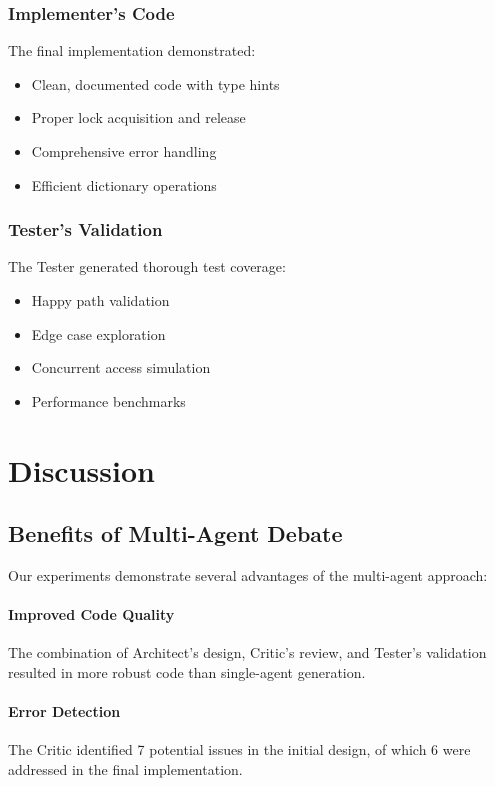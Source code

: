 \documentclass[12pt,a4paper]{article}
\begin{document}
\subsubsection{Implementer's Code}
The final implementation demonstrated:
\begin{itemize}
    \item Clean, documented code with type hints
    \item Proper lock acquisition and release
    \item Comprehensive error handling
    \item Efficient dictionary operations
\end{itemize}

\subsubsection{Tester's Validation}
The Tester generated thorough test coverage:
\begin{itemize}
    \item Happy path validation
    \item Edge case exploration
    \item Concurrent access simulation
    \item Performance benchmarks
\end{itemize}

\section{Discussion}

\subsection{Benefits of Multi-Agent Debate}

Our experiments demonstrate several advantages of the multi-agent approach:

\paragraph{Improved Code Quality}
The combination of Architect's design, Critic's review, and Tester's validation resulted in more robust code than single-agent generation.

\paragraph{Error Detection}
The Critic identified 7 potential issues in the initial design, of which 6 were addressed in the final implementation.
\end{document}
